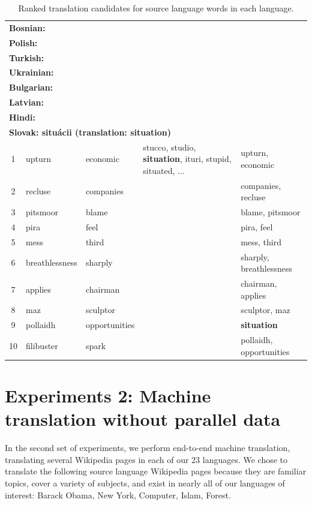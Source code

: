 \documentclass[11pt]{article}
\begin{document}
\begin{table}
\begin{center}
\begin{tabular}{| c | l | l | l | l |}
\multicolumn{5}{|l|}{{\bf Bosnian: } } \\
\multicolumn{5}{|l|}{{\bf Polish: } } \\
\multicolumn{5}{|l|}{{\bf Turkish: } } \\
\multicolumn{5}{|l|}{{\bf Ukrainian: } } \\
\multicolumn{5}{|l|}{{\bf Bulgarian: } } \\
\multicolumn{5}{|l|}{{\bf Latvian: } } \\
\multicolumn{5}{|l|}{{\bf Hindi: } } \\
\hline
\hline
\multicolumn{5}{|l|}{{\bf Slovak: situ\'{a}cii (translation: situation)}} \\
\hline
1 & upturn & economic & stucco, studio, {\bf situation}, ituri, stupid, situated, ...& upturn, economic \\
2 & recluse & companies & &  companies, recluse \\
3 & pitsmoor & blame & & blame, pitsmoor \\
4 & pira & feel & & pira, feel \\
5 & mess & third & & mess, third \\
6 & breathlessness & sharply & & sharply, breathlessness \\
7 & applies & chairman & & chairman, applies \\
8 & maz & sculptor & & sculptor, maz \\
9 & pollaidh & opportunities & & {\bf situation} \\
10 & filibuster & spark & & pollaidh, opportunities \\
\hline
\hline
\end{tabular}
\end{center}
\caption{\label{table:lexinducexamples}Ranked translation candidates for source language words in each language.}
\end{table}

\section{Experiments 2: Machine translation without parallel data}\label{sec:mtwpd}
In the second set of experiments, we perform end-to-end machine translation, translating several Wikipedia pages in each of our 23 languages. We chose to translate the following source language Wikipedia pages because they are familiar topics, cover a variety of subjects, and exist in nearly all of our languages of interest: Barack Obama, New York, Computer, Islam, Forest. 
\end{document}
